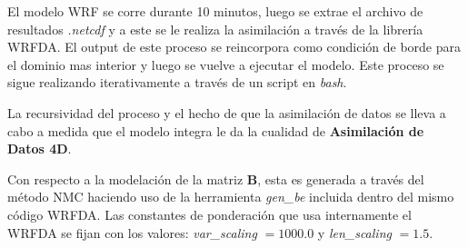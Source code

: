 El modelo WRF se corre durante 10 minutos, luego se extrae el archivo de resultados \emph{.netcdf} y a este se le realiza la asimilación a través de la librería WRFDA. El output de este proceso se reincorpora como condición de borde para el dominio mas interior y luego se vuelve a ejecutar el modelo. Este proceso se sigue realizando iterativamente a través de un script en \emph{bash}.

La recursividad del proceso y el hecho de que la asimilación de datos se lleva a cabo a medida que el modelo integra le da la cualidad de \textbf{Asimilación de Datos 4D}.

Con respecto a la modelación de la matriz $\textbf{B}$, esta es generada a través del método NMC \citep{https://doi.org/10.5065/d68s4mvh} haciendo uso de la herramienta \emph{gen\_be} incluida dentro del mismo código WRFDA. Las constantes de ponderación que usa internamente el WRFDA se fijan con los valores: \emph{var\_scaling} $=1000.0$ y \emph{len\_scaling} $=1.5$.

